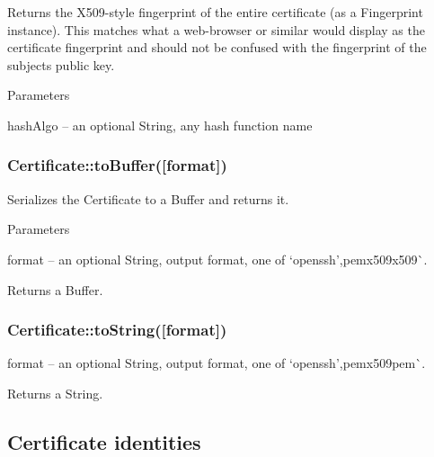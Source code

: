 Returns the X509-\/style fingerprint of the entire certificate (as a Fingerprint instance). This matches what a web-\/browser or similar would display as the certificate fingerprint and should not be confused with the fingerprint of the subject\textquotesingle{}s public key.

Parameters


\begin{DoxyItemize}
\item {\ttfamily hash\+Algo} -- an optional String, any hash function name
\end{DoxyItemize}

\subsubsection*{{\ttfamily Certificate\+::to\+Buffer(\mbox{[}format\mbox{]})}}

Serializes the Certificate to a Buffer and returns it.

Parameters


\begin{DoxyItemize}
\item {\ttfamily format} -- an optional String, output format, one of `\textquotesingle{}openssh'{\ttfamily ,}\textquotesingle{}pem\textquotesingle{}x509\textquotesingle{}x509\textquotesingle{}\`{}.
\end{DoxyItemize}

Returns a Buffer.

\subsubsection*{{\ttfamily Certificate\+::to\+String(\mbox{[}format\mbox{]})}}


\begin{DoxyItemize}
\item {\ttfamily format} -- an optional String, output format, one of `\textquotesingle{}openssh'{\ttfamily ,}\textquotesingle{}pem\textquotesingle{}x509\textquotesingle{}pem\textquotesingle{}\`{}.
\end{DoxyItemize}

Returns a String.

\subsection*{Certificate identities}

